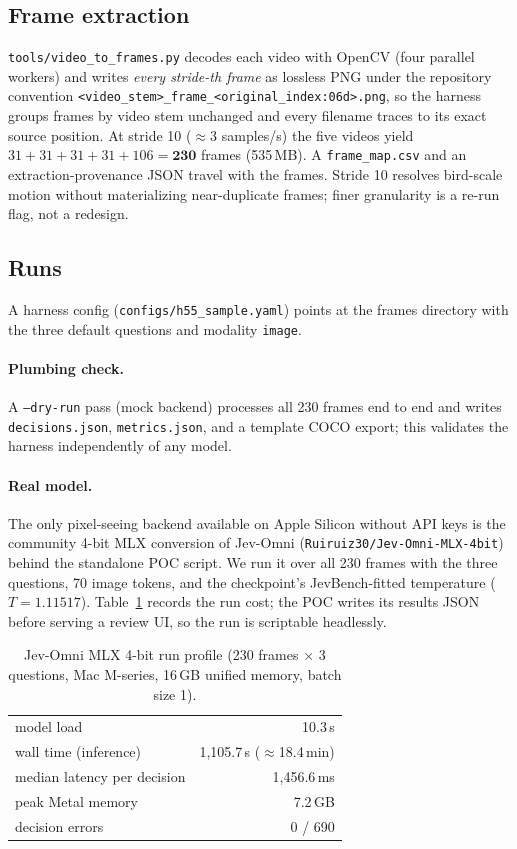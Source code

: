 \documentclass[11pt]{article}
\newcommand{\code}[1]{\texttt{#1}}
\begin{document}
\subsection{Frame extraction}

\code{tools/video\_to\_frames.py} decodes each video with OpenCV (four
parallel workers) and writes \emph{every stride-th frame} as lossless PNG
under the repository convention
\code{<video\_stem>\_frame\_<original\_index:06d>.png}, so the harness groups
frames by video stem unchanged and every filename traces to its exact source
position. At stride 10 ($\approx$3 samples/s) the five videos yield
$31{+}31{+}31{+}31{+}106 = \mathbf{230}$ frames (535\,MB). A
\code{frame\_map.csv} and an extraction-provenance JSON travel with the
frames. Stride 10 resolves bird-scale motion without materializing
near-duplicate frames; finer granularity is a re-run flag, not a redesign.

\subsection{Runs}

A harness config (\code{configs/h55\_sample.yaml}) points at the frames
directory with the three default questions and modality \code{image}.

\paragraph{Plumbing check.} A \code{--dry-run} pass (mock backend) processes
all 230 frames end to end and writes \code{decisions.json},
\code{metrics.json}, and a template COCO export; this validates the harness
independently of any model.

\paragraph{Real model.} The only pixel-seeing backend available on Apple
Silicon without API keys is the community 4-bit MLX conversion of Jev-Omni
(\code{Ruiruiz30/Jev-Omni-MLX-4bit}) behind the standalone POC script. We run
it over all 230 frames with the three questions, 70 image tokens, and the
checkpoint's JevBench-fitted temperature ($T = 1.11517$). Table~\ref{tab:run}
records the run cost; the POC writes its results JSON before serving a review
UI, so the run is scriptable headlessly.

\begin{table}[t]
\centering
\caption{Jev-Omni MLX 4-bit run profile (230 frames $\times$ 3 questions,
Mac M-series, 16\,GB unified memory, batch size 1).}
\label{tab:run}
\begin{tabular}{lr}
\toprule
model load & 10.3\,s \\
wall time (inference) & 1{,}105.7\,s ($\approx$18.4\,min) \\
median latency per decision & 1{,}456.6\,ms \\
peak Metal memory & 7.2\,GB \\
decision errors & 0 / 690 \\
\bottomrule
\end{tabular}
\end{table}
\end{document}
